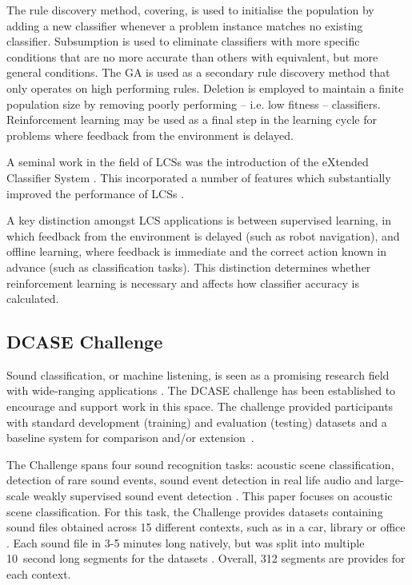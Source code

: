\documentclass[11pt]{article}
\begin{document}
\begin{multicols}{2}
The rule discovery method, covering, is used to initialise the population by adding a new classifier whenever a problem instance matches no existing classifier. Subsumption is used to eliminate classifiers with more specific conditions that are no more accurate than others with equivalent, but more general conditions. The GA is used as a secondary rule discovery method that only operates on high performing rules. Deletion is employed to maintain a finite population size by removing poorly performing -- i.e. low fitness -- classifiers. Reinforcement learning may be used as a final step in the learning cycle for problems where feedback from the environment is delayed.

A seminal work in the field of LCSs was the introduction of the eXtended Classifier System \cite{Lanzi2008,Sigaud2007}. This incorporated a number of features which substantially improved the performance of LCSs \cite{Lanzi2008}.

A key distinction amongst LCS applications is between supervised learning, in which feedback from the environment is delayed (such as robot navigation), and offline learning, where feedback is immediate and the correct action known in advance (such as classification tasks). This distinction determines whether reinforcement learning is necessary and affects how classifier accuracy is calculated.



\subsection{DCASE Challenge}
\label{sec:DCASE}

Sound classification, or machine listening, is seen as a promising research field with wide-ranging applications \cite{Mesaros2017}. The DCASE challenge has been established to encourage and support work in this space. The challenge provided participants with standard development (training) and evaluation (testing) datasets \cite{Mesaros2016} and a baseline system for comparison and/or extension~\cite{Mesaros2017,DCASE2017asc}.

The Challenge spans four sound recognition tasks: acoustic scene classification, detection of rare sound events, sound event detection in real life audio and large-scale weakly supervised sound event detection \cite{Mesaros2017}. This paper focuses on acoustic scene classification. For this task, the Challenge provides datasets containing sound files obtained across 15 different contexts, such as in a car, library or office \cite{DCASE2017asc}. Each sound file in 3-5 minutes long natively, but was split into multiple 10~second long segments for the datasets \cite{DCASE2017asc}. Overall, 312 segments are provides for each context.


\end{multicols}
\end{document}
